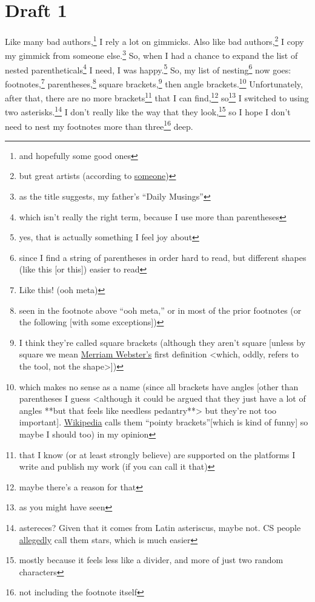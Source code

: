 \documentclass[a4paper]{article}
\newcommand{\say}[1]{``#1''}
\newcommand{\1}{\={a}}
\newcommand{\2}{\={e}}
\newcommand{\3}{\={\i}}
\newcommand{\4}{\=o}
\newcommand{\5}{\=u}
\newcommand{\6}{\={A}}
\newcommand{\<}{\textless}
\renewcommand{\>}{\textgreater}
\renewcommand{\,}{\textsuperscript{,}}
\begin{document}
\section{Draft 1}
Like many bad authors,\footnote{and hopefully some good ones} I rely a lot on gimmicks.
Also like bad authors,\footnote{but great artists (according to \href{https://quoteinvestigator.com/2013/03/06/artists-steal/}{someone})} I copy my gimmick from someone else.\footnote{as the title suggests, my father's \say{Daily Musings}}
So, when I had a chance to expand the list of nested parentheticals\footnote{which isn't really the right term, because I use more than parentheses} I need, I was happy.\footnote{yes, that is actually something I feel joy about}
So, my list of nesting\footnote{since I find a string of parentheses in order hard to read, but different shapes (like this [or this]) easier to read} now goes: footnotes,\footnote{Like this! (ooh meta)} parentheses,\footnote{seen in the footnote above \say{ooh meta,} or in most of the prior footnotes (or the following [with some exceptions])} square brackets,\footnote{I think they're called square brackets (although they aren't square [unless by square we mean \href{https://www.merriam-webster.com/dictionary/square}{Merriam Webster's} first definition \<which, oddly, refers to the tool, not the shape\>])} then angle brackets.\footnote{which makes no sense as a name (since all brackets have angles [other than parentheses I guess \<although it could be argued that they just have a lot of angles **but that feels like needless pedantry**\> but they're not too important]. \href{https://en.wikipedia.org/wiki/Bracket}{Wikipedia} calls them \say{pointy brackets}[which is kind of funny] so maybe I should too) in my opinion}
Unfortunately, after that, there are no more brackets\footnote{that I know (or at least strongly believe) are supported on the platforms I write and publish my work (if you can call it that)} that I can find,\footnote{maybe there's a reason for that} so\footnote{as you might have seen} I switched to using two asterisks.\footnote{astereces? Given that it comes from Latin asteriscus, maybe not. CS people \href{https://en.wikipedia.org/wiki/Asterisk}{allegedly} call them stars, which is much easier}
I don't really like the way that they look,\footnote{mostly because it feels less like a divider, and more of just two random characters} so I hope I don't need to nest my footnotes more than three\footnote{not including the footnote itself} deep.
\end{document}
